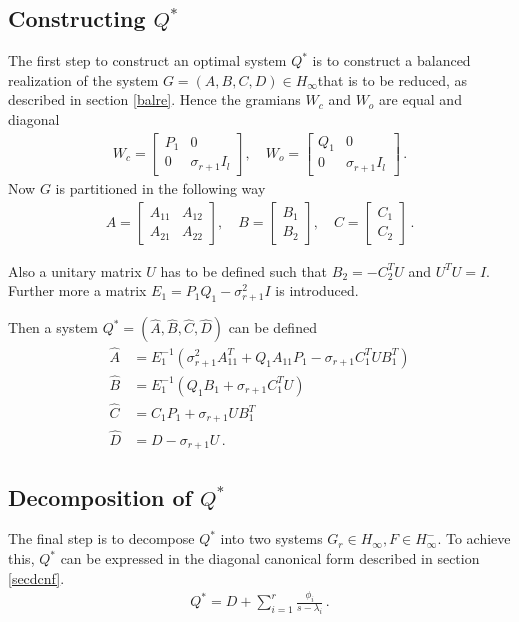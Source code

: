 \subsection{Constructing \(Q^{*}\)}
The first step to construct an optimal system \(Q^{*}\) is to construct a balanced realization of the system \(G = (A, B, C, D) \in H_{\infty}\)that is to be reduced, as described in section \ref{balre}.
Hence the gramians \(W_c\) and \(W_o\) are equal and diagonal
\begin{gather}
W_c = \begin{bmatrix}
P_1 & 0 \\
0 & \sigma_{r+1}I_l
\end{bmatrix}, \quad
W_o = \begin{bmatrix}
Q_1 & 0 \\
0 & \sigma_{r+1}I_l
\end{bmatrix} \,. 
\end{gather}
Now \(G\) is partitioned in the following way
\begin{gather}
A = \begin{bmatrix}
A_{11} & A_{12} \\
A_{21} & A_{22}
\end{bmatrix}, \quad 
B = \begin{bmatrix}
B_{1}  \\
B_{2} 
\end{bmatrix}, \quad 
C = \begin{bmatrix}
C_{1}  \\
C_{2} 
\end{bmatrix} \,.
\end{gather}

Also a unitary matrix \(U\) has to be defined such that \(B_2 = -C_2^TU\) and \(U^TU = I\). 
Further more a matrix \(E_1 = P_1Q_1-\sigma_{r+1}^2I\) is introduced.

Then a system \(Q^* = (\hat{A}, \hat{B}, \hat{C}, \hat{D})\) can be defined \cite{sandberg}
\begin{align}
\hat{A} &= E_1^{-1}(\sigma_{r+1}^2A_{11}^T + Q_1 A_{11}P_1 - \sigma_{r+1}C_1^TUB_1^T) \\
\hat{B} &= E_1^{-1}(Q_1B_1 + \sigma_{r+1}C_1^TU)\\
\hat{C} &= C_1P_1 + \sigma_{r+1}UB_1^T \\
\hat{D} &= D - \sigma_{r+1}U \,.
\end{align}

\subsection{Decomposition of \(Q^{*}\)}
The final step is to decompose \(Q^{*}\) into two systems \(G_r \in H_{\infty}, F \in H_{\infty}^{-}\).
To achieve this, \(Q^{*}\) can be expressed in the diagonal canonical form described in section \ref{secdcnf}.
\begin{gather}
Q^{*} = D + \sum_{i=1}^{r} \frac{\phi_i}{s-\lambda_i} \,.
\end{gather}

